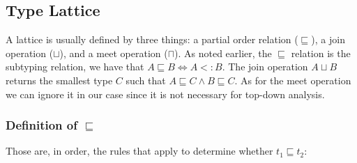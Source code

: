 \documentclass[a4paper]{article}
\begin{document}
\subsection{Type Lattice}
A lattice is usually defined by three things: a partial order relation
($\sqsubseteq$), a join operation ($\sqcup$), and a meet operation ($\sqcap$). As noted
earlier, the $\sqsubseteq$ relation is the subtyping relation, we have that $A \sqsubseteq B
\Leftrightarrow A <: B$. The join operation $A \sqcup B$ returns the smallest
type $C$ such that $A \sqsubseteq C \wedge B \sqsubseteq C$. As for the meet operation
we can ignore it in our case since it is not necessary for top-down analysis.

\subsubsection{Definition of $\sqsubseteq$}
Those are, in order, the rules that apply to determine whether $t_1 \sqsubseteq t_2$:
\end{document}
